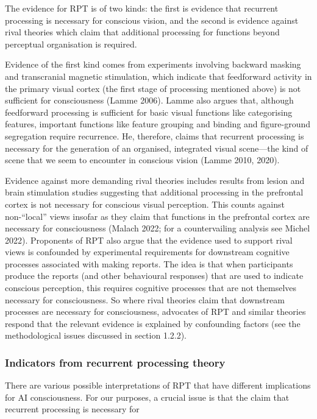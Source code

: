 \documentclass[12pt]{article}
\begin{document}
The evidence for RPT is of two kinds: the first is evidence that recurrent processing is necessary for conscious vision, and the second is evidence against rival theories which claim that additional processing for functions beyond perceptual organisation is required.

Evidence of the first kind comes from experiments involving backward masking and transcranial magnetic stimulation, which indicate that feedforward activity in the primary visual cortex (the first stage of processing mentioned above) is not sufficient for consciousness (Lamme 2006). Lamme also argues that, although feedforward processing is sufficient for basic visual functions like categorising features, important functions like feature grouping and binding and figure-ground segregation require recurrence. He, therefore, claims that recurrent processing is necessary for the generation of an organised, integrated visual scene—the kind of scene that we seem to encounter in conscious vision (Lamme 2010, 2020).

Evidence against more demanding rival theories includes results from lesion and brain stimulation studies suggesting that additional processing in the prefrontal cortex is not necessary for conscious visual perception. This counts against non-``local'' views insofar as they claim that functions in the prefrontal cortex are necessary for consciousness (Malach 2022; for a countervailing analysis see Michel 2022). Proponents of RPT also argue that the evidence used to support rival views is confounded by experimental requirements for downstream cognitive processes associated with making reports. The idea is that when participants produce the reports (and other behavioural responses) that are used to indicate conscious perception, this requires cognitive processes that are not themselves necessary for consciousness. So where rival theories claim that downstream processes are necessary for consciousness, advocates of RPT and similar theories respond that the relevant evidence is explained by confounding factors (see the methodological issues discussed in section 1.2.2).

\newpage

\subsubsection{Indicators from recurrent processing theory}

There are various possible interpretations of RPT that have different implications for AI consciousness. For our purposes, a crucial issue is that the claim that recurrent processing is necessary for
\end{document}
